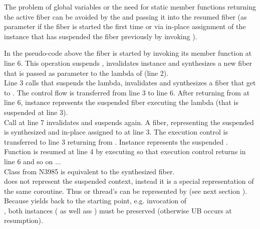 \label{solution_gpub}


\label{synthesizing}
The problem of global variables or the need for static member functions
returning the active fiber can be avoided by  the
 and passing it into the resumed fiber (as parameter if the
fiber is started the first time or via in-place assignment of the instance that
has suspended the fiber previously by invoking \resume).

In the pseudo-code above the fiber  is started by invoking its member
function \resume at line 6. This operation suspends , invalidates
instance  and synthesizes a new fiber  that is passed as parameter
to the lambda of  (line 2).\\
Line 3 calls  that suspends the lambda, invalidates  and
synthesizes a fiber that get  to . The control
flow is transferred from line 3 to line 6. After returning from 
at line 6, instance  represents the suspended fiber executing the lambda
(that is suspended at line 3).\\
Call  at line 7 invalidates  and suspends 
again. A fiber, representing the suspended  is synthesized and
in-place assigned to  at line 3. The execution control is transferred to
line 3 returning from . Instance  represents the
suspended .\\
Function  is resumed at line 4 by executing  so that
execution control returns in line 6 and so on ...\\

Class  from  N3985\cite{N3985} is
 equivalent to the synthesized fiber.\\
 does not represent the suspended context,
instead it is a special representation of the same coroutine. Thus \main or
thread's \entryfn\xspace can  be represented by 
(see next section ).\\
Because  yields back to the starting
point, e.g. invocation of\\
,
both instances ( as well ass ) must be preserved
(otherwise UB occurs at resumption).\\

